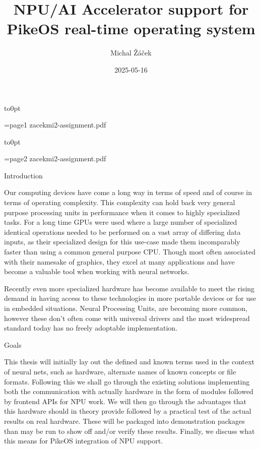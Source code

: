 \load[ctustyle3]
\worktype[B/EN]
\title{NPU/AI Accelerator support for PikeOS real-time operating system}
\author{Michal Žáček}
\date{2025-05-16}
\draft

\def\OpenVX{OpenVX™}
\def\VeriSilicon{VeriSilicon}
\def\NXP{NXP}
\def\textemdash{-}

\totf

\def\insertassignmentpage[#1]{
        \nopagenumbers
        \vbox to0pt{\vskip-25mm\centerline{\picparams={#1} \inspic zacekmi2-assignment.pdf }\vss}
        \break
}

\insertassignmentpage[page1]
\insertassignmentpage[page2]

\makefront

\chap Introduction

Our computing devices have come a long way in terms of speed
and of course in terms of operating complexity.
This complexity can hold back very general purpose processing units
in performance when it comes to highly specialized tasks.
For a long time GPUs were used where a large number
of specialized identical operations needed to be performed on
a vast array of differing data inputs,
as their specialized design for this use-case made them incomparably faster than
using a common general purpose CPU.
Though most often associated with their namesake of graphics,
they excel at many applications and have become a
valuable tool when working with neural networks.

Recently even more specialized hardware has become available
to meet the rising demand in having access to these technologies
in more portable devices or for use in embedded situations.
Neural Processing Units,
are becoming more common,
however these don't often come with universal drivers
and the most widespread standard today has no freely adoptable implementation.

\sec Goals

This thesis will initially lay out the defined and known terms used in the context of neural nets, such as hardware, alternate names of known concepts or file formats.
Following this we shall go through the existing solutions implementing both the communication with actually hardware in the form of modules followed by frontend APIs for NPU work.
We will then go through the advantages that this hardware should in theory provide followed by a practical test of the actual results on real hardware.
These will be packaged into demonstration packages than may be run to show off and/or verify these results.
Finally, we discuss what this means for PikeOS integration of NPU support.


